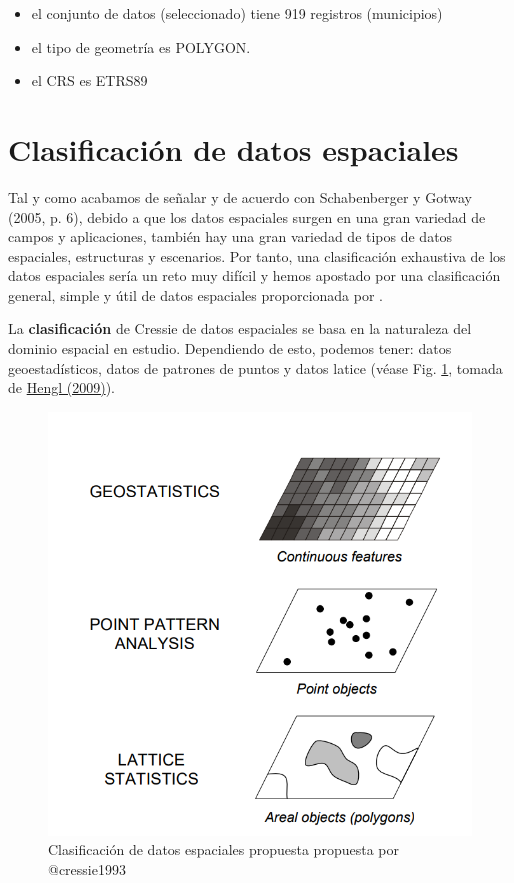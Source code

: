 \documentclass[
]{report}
\providecommand{\tightlist}{%
  \setlength{\itemsep}{0pt}\setlength{\parskip}{0pt}}
\begin{document}
\begin{itemize}
\tightlist
\item
  el conjunto de datos (seleccionado) tiene 919 registros (municipios)
\item
  el tipo de geometría es POLYGON.
\item
  el CRS es ETRS89
\end{itemize}

\hypertarget{clasificaciuxf3n-de-datos-espaciales}{%
\section{Clasificación de datos espaciales}\label{clasificaciuxf3n-de-datos-espaciales}}

Tal y como acabamos de señalar y de acuerdo con Schabenberger y Gotway (2005, p.
6), debido a que los datos espaciales surgen en una gran variedad de campos y
aplicaciones, también hay una gran variedad de tipos de datos espaciales,
estructuras y escenarios. Por tanto, una clasificación exhaustiva de los datos
espaciales sería un reto muy difícil y hemos apostado por una clasificación
general, simple y útil de datos espaciales proporcionada por \citet{cressie1993}.

La \textbf{clasificación} de Cressie de datos espaciales se basa en la naturaleza del
dominio espacial en estudio. Dependiendo de esto, podemos tener: datos
geoestadísticos, datos de patrones de puntos y datos latice (véase Fig.
\ref{fig:hengl-cressie}, tomada de \href{http://spatial-analyst.net/book/system/files/Hengl_2009_GEOSTATe2c1w.pdf}{Hengl
(2009)}).

\begin{figure}

{\centering \includegraphics[width=0.6\linewidth]{img/hengl_cressie_clases} 

}

\caption{Clasificación de datos espaciales propuesta propuesta por @cressie1993}\label{fig:hengl-cressie}
\end{figure}
\end{document}
